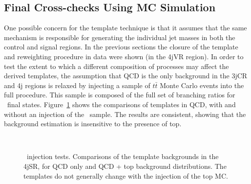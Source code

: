 \subsection{Final Cross-checks Using MC Simulation}
\label{chapter:search:search:mc}

One possible concern for the template technique is that it assumes that the same mechanism is responsible for generating the individual jet masses in both the control and signal regions. In the previous sections the closure of the template and reweighting procedure in data were shown (in the 4jVR region). In order to test the extent to which a different composition of processes may affect the derived templates, the assumption that QCD is the only background in the 3jCR and 4j regions is relaxed by injecting a sample of \Sherpa $t\bar{t}$ Monte Carlo events into the full procedure. This sample is composed of the full set of branching ratios for \ttbar\ final states. Figure~\ref{fig:search:search:mccheck:4jTop} shows the comparisons of templates in \Sherpa QCD, with and without an injection of the \ttbar\ sample. The results are consistent, showing that the background estimation is insensitive to the presence of top.

\begin{figure}[!ht]
  \centering
  
  \\
    
  \caption{\ttbar\ injection tests. Comparisons of the template backgrounds in the 4jSR, for QCD only and QCD + top background distributions. The templates do not generally change with the injection of the top MC.}
               
  \label{fig:search:search:mccheck:4jTop}
\end{figure}



